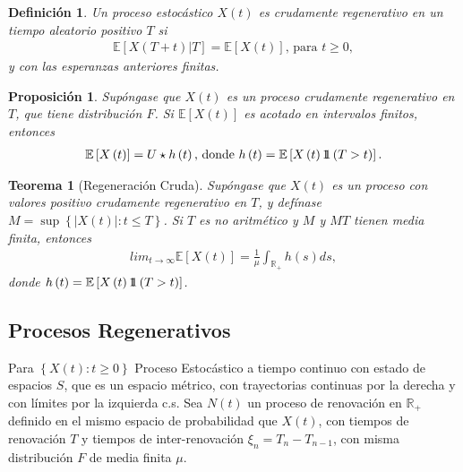\documentclass{article}
\newtheorem{Def}{Definición}
\newtheorem{Teo}{Teorema}
\newtheorem{Prop}{Proposición}
\newcommand{\rea}{\mathbb{R}}
\newcommand{\esp}{\mathbb{E}}
\newcommand{\indora}{\mbox{$1$\hspace{-0.8ex}$1$}}
\begin{document}
\begin{Def}
Un proceso estoc\'astico $X\left(t\right)$ es crudamente regenerativo en un tiempo aleatorio positivo $T$ si
\begin{eqnarray*}
\esp\left[X\left(T+t\right)|T\right]=\esp\left[X\left(t\right)\right]\textrm{, para }t\geq0,\end{eqnarray*}
y con las esperanzas anteriores finitas.
\end{Def}

\begin{Prop}
Sup\'ongase que $X\left(t\right)$ es un proceso crudamente regenerativo en $T$, que tiene distribuci\'on $F$. Si $\esp\left[X\left(t\right)\right]$ es acotado en intervalos finitos, entonces
\begin{eqnarray*}
\esp\left[X\left(t\right)\right]=U\star h\left(t\right)\textrm{,  donde }h\left(t\right)=\esp\left[X\left(t\right)\indora\left(T>t\right)\right].
\end{eqnarray*}
\end{Prop}

\begin{Teo}[Regeneraci\'on Cruda]
Sup\'ongase que $X\left(t\right)$ es un proceso con valores positivo crudamente regenerativo en $T$, y def\'inase $M=\sup\left\{|X\left(t\right)|:t\leq T\right\}$. Si $T$ es no aritm\'etico y $M$ y $MT$ tienen media finita, entonces
\begin{eqnarray*}
lim_{t\rightarrow\infty}\esp\left[X\left(t\right)\right]=\frac{1}{\mu}\int_{\rea_{+}}h\left(s\right)ds,
\end{eqnarray*}
donde $h\left(t\right)=\esp\left[X\left(t\right)\indora\left(T>t\right)\right]$.
\end{Teo}

\subsection{Procesos Regenerativos}

Para $\left\{X\left(t\right):t\geq0\right\}$ Proceso Estoc\'astico a tiempo continuo con estado de espacios $S$, que es un espacio m\'etrico, con trayectorias continuas por la derecha y con l\'imites por la izquierda c.s. Sea $N\left(t\right)$ un proceso de renovaci\'on en $\rea_{+}$ definido en el mismo espacio de probabilidad que $X\left(t\right)$, con tiempos de renovaci\'on $T$ y tiempos de inter-renovaci\'on $\xi_{n}=T_{n}-T_{n-1}$, con misma distribuci\'on $F$ de media finita $\mu$.
\end{document}
